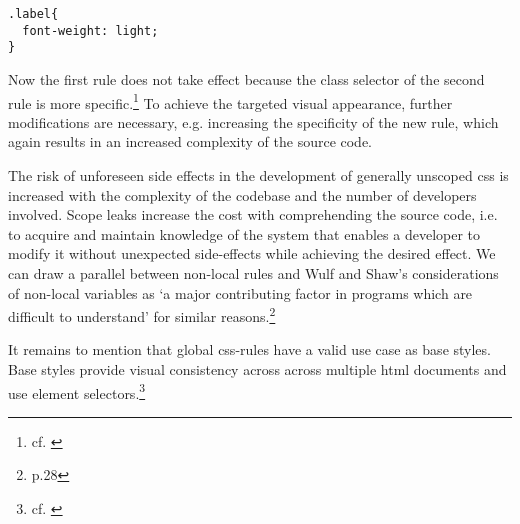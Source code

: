 \begin{lstlisting}
.label{
  font-weight: light;
}
\end{lstlisting}

Now the first rule does not take effect because the class selector of the second rule is more specific.\footnote{cf. \cite{w3conselectors}}
To achieve the targeted visual appearance, further modifications are necessary, e.g. increasing the specificity of the new rule, which again results in an increased complexity of the source code.

The risk of unforeseen side effects in the development of generally unscoped \gls{css} is increased with the complexity of the codebase and the number of developers involved.
Scope leaks increase the cost with comprehending the source code, i.e. to acquire and maintain knowledge of the system that enables a developer to modify it without unexpected side-effects while achieving the desired effect.
We can draw a parallel between non-local rules and Wulf and Shaw's considerations of non-local variables as `a major contributing factor in programs which are difficult to understand' for similar reasons.\footnote{\cite{globalvariables} p.28}

It remains to mention that global \gls{css}-rules have a valid use case as base styles.
Base styles provide visual consistency across across multiple \gls{html} documents and use element selectors.\footnote{cf. \cite{mpgcss}}
